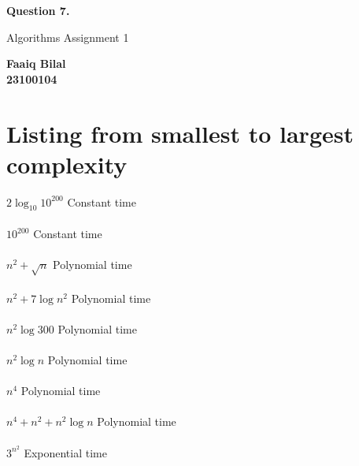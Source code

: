\documentclass[]{article}
\begin{document}
\begin{center}
    \vspace*{1cm}

    \textbf{Question 7.}

    \vspace{0.5cm}
     Algorithms Assignment 1

    \vspace{0.15cm}

    \textbf{Faaiq Bilal} \\ 
    \textbf{23100104}
         
\end{center}

\section{Listing from smallest to largest complexity}

$2 \log_{10} 10^{200}$ Constant time \\ \\
$10^{200}$ Constant time \\ \\ 
$n^2 + \sqrt{n}$  Polynomial time \\ \\ 
$n^2 + 7 \log n^2$ Polynomial time \\ \\ 
$ n^2 \log 300  $ Polynomial time \\ \\ 
$ n^2 \log n $ Polynomial time \\ \\
$ n^4 $ Polynomial time \\ \\ 
$ n^4 + n^2 + n^2 \log n $ Polynomial time \\ \\
$ 3^{n^2} $ Exponential time \\ \\
\end{document}
